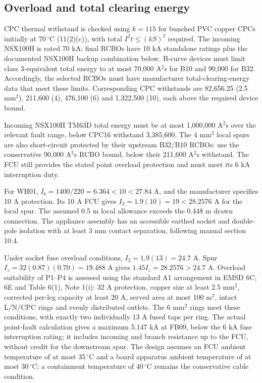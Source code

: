 \subsection*{Overload and total clearing energy}
CPC thermal withstand is checked using $k=115$ for bunched PVC copper CPCs initially at 70\,$^\circ$C (11(2)(c)), with total $I^2t\le(kS)^2$ required. The incoming NSX100H is rated 70 kA; final RCBOs have 10 kA standalone ratings plus the documented NSX100H backup combination below. B-curve devices must limit class 3-equivalent total energy to at most 70,000 A$^2$s for B10 and 90,000 for B32. Accordingly, the selected RCBOs must have manufacturer total-clearing-energy data that meet these limits. Corresponding CPC withstands are 82,656.25 (2.5 mm$^2$), 211,600 (4), 476,100 (6) and 1,322,500 (10), each above the required device bound.

Incoming NSX100H TM63D total energy must be at most 1,000,000 A$^2$s over the relevant fault range, below CPC16 withstand 3,385,600. The 4 mm$^2$ local spurs are also short-circuit protected by their upstream B32/B10 RCBOs: use the conservative 90,000 A$^2$s RCBO bound, below their 211,600 A$^2$s withstand. The FCU still provides the stated point overload protection and must meet its 6 kA interruption duty.

For WH01, $I_b=1400/220=6.364<10<27.84$ A, and the manufacturer specifies 10 A protection. Its 10 A FCU gives $I_2=1.9(10)=19<28.2576$ A for the local spur. The assumed 0.5 m local allowance exceeds the 0.448 m drawn connection. The appliance assembly has an accessible earthed socket and double-pole isolation with at least 3 mm contact separation, following manual section 10.4.

Under socket fuse overload conditions, $I_2=1.9(13)=24.7$ A. Spur $I_z=32(0.87)(0.70)=19.488$ A gives $1.45I_z=28.2576>24.7$ A. Overload suitability of P1--P4 is assessed using the standard A1 arrangement in EMSD 6C, 6E and Table 6(1), Note 1(i): 32 A protection, copper size at least 2.5 mm$^2$, corrected per-leg capacity at least 20 A, served area at most 100 m$^2$, intact L/N/CPC rings and evenly distributed outlets. The 6 mm$^2$ rings meet these conditions, with exactly two individually 13 A fused taps per ring. The actual point-fault calculation gives a maximum 5.147 kA at FB09, below the 6 kA fuse interruption rating; it includes incoming and branch resistance up to the FCU, without credit for the downstream spur. The design assumes an FCU ambient temperature of at most 35\,$^\circ$C and a board apparatus ambient temperature of at most 30\,$^\circ$C; a containment temperature of 40\,$^\circ$C remains the conservative cable condition.

